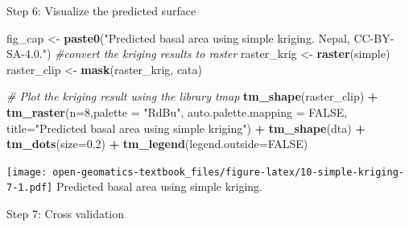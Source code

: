 \documentclass[
]{book}
\newenvironment{Shaded}{\begin{snugshade}}{\end{snugshade}}
\newcommand{\AttributeTok}[1]{\textcolor[rgb]{0.13,0.29,0.53}{#1}}
\newcommand{\CommentTok}[1]{\textcolor[rgb]{0.56,0.35,0.01}{\textit{#1}}}
\newcommand{\ConstantTok}[1]{\textcolor[rgb]{0.56,0.35,0.01}{#1}}
\newcommand{\DecValTok}[1]{\textcolor[rgb]{0.00,0.00,0.81}{#1}}
\newcommand{\DocumentationTok}[1]{\textcolor[rgb]{0.56,0.35,0.01}{\textbf{\textit{#1}}}}
\newcommand{\FloatTok}[1]{\textcolor[rgb]{0.00,0.00,0.81}{#1}}
\newcommand{\FunctionTok}[1]{\textcolor[rgb]{0.13,0.29,0.53}{\textbf{#1}}}
\newcommand{\NormalTok}[1]{#1}
\newcommand{\OtherTok}[1]{\textcolor[rgb]{0.56,0.35,0.01}{#1}}
\newcommand{\SpecialCharTok}[1]{\textcolor[rgb]{0.81,0.36,0.00}{\textbf{#1}}}
\newcommand{\StringTok}[1]{\textcolor[rgb]{0.31,0.60,0.02}{#1}}
\begin{document}
Step 6: Visualize the predicted surface

\begin{Shaded}
\begin{Highlighting}[]
\NormalTok{fig\_cap }\OtherTok{\textless{}{-}} \FunctionTok{paste0}\NormalTok{(}\StringTok{"Predicted basal area using simple kriging. Nepal, CC{-}BY{-}SA{-}4.0."}\NormalTok{)}
\CommentTok{\#convert the kriging results to raster}
\NormalTok{raster\_krig      }\OtherTok{\textless{}{-}} \FunctionTok{raster}\NormalTok{(simple)}
\NormalTok{raster\_clip    }\OtherTok{\textless{}{-}} \FunctionTok{mask}\NormalTok{(raster\_krig, cata)}

\CommentTok{\# Plot the kriging result using the library tmap}
\FunctionTok{tm\_shape}\NormalTok{(raster\_clip) }\SpecialCharTok{+} 
  \FunctionTok{tm\_raster}\NormalTok{(}\AttributeTok{n=}\DecValTok{8}\NormalTok{,}\AttributeTok{palette =} \StringTok{"RdBu"}\NormalTok{, }\AttributeTok{auto.palette.mapping =} \ConstantTok{FALSE}\NormalTok{,}
            \AttributeTok{title=}\StringTok{"Predicted basal area using simple kriging"}\NormalTok{) }\SpecialCharTok{+} 
  \FunctionTok{tm\_shape}\NormalTok{(dta) }\SpecialCharTok{+} \FunctionTok{tm\_dots}\NormalTok{(}\AttributeTok{size=}\FloatTok{0.2}\NormalTok{) }\SpecialCharTok{+}
  \FunctionTok{tm\_legend}\NormalTok{(}\AttributeTok{legend.outside=}\ConstantTok{FALSE}\NormalTok{)}
\end{Highlighting}
\end{Shaded}

\texttt{[image: open-geomatics-textbook\_files/figure-latex/10-simple-kriging-7-1.pdf]}
Predicted basal area using simple kriging.

Step 7: Cross validation

\begin{Shaded}
\end{Shaded}
\end{document}

